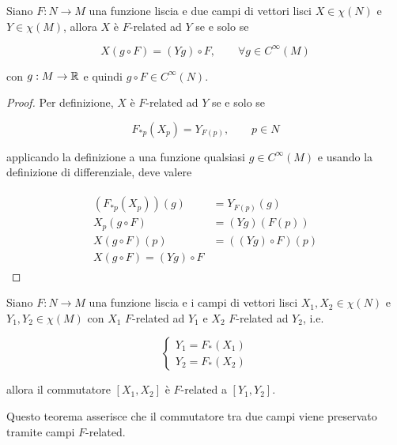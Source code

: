 \begin{theorem}
	Siano $ F : N \to M $ una funzione liscia e due campi di vettori lisci $ X \in \chi(N) $ e $ Y \in \chi(M) $, allora $ X $ è $ F $-related ad $ Y $ se e solo se
	
	\begin{equation}
		X(g \circ F) = (Y g) \circ F, \qquad \forall g \in C^{\infty}(M)
	\end{equation}

	con $ g : M \to \mathbb{R} $ e quindi $ g \circ F \in C^{\infty}(N) $.
\end{theorem}

\begin{proof}
	Per definizione, $ X $ è $ F $-related ad $ Y $ se e solo se
	
	\begin{equation}
		F_{*p}(X_{p}) = Y_{F(p)}, \qquad p \in N
	\end{equation}

	applicando la definizione a una funzione qualsiasi $ g \in C^{\infty}(M) $ e usando la definizione di differenziale, deve valere
	
	\begin{align}
		\begin{split}
			(F_{*p}(X_{p}))(g) &= Y_{F(p)}(g)\\
			X_{p}(g \circ F) &= (Y g)(F(p))\\
			X(g \circ F)(p) &= ((Y g) \circ F)(p)\\
			X(g \circ F) = (Y g) \circ F
		\end{split}
	\end{align}
\end{proof}

\begin{theorem}
	Siano $ F : N \to M $ una funzione liscia e i campi di vettori lisci $ X_{1},X_{2} \in \chi(N) $ e $ Y_{1},Y_{2} \in \chi(M) $ con $ X_{1} $ $ F $-related ad $ Y_{1} $ e $ X_{2} $ $ F $-related ad $ Y_{2} $, i.e.
	
	\begin{equation}
		\begin{cases}
			Y_{1} = F_{*}(X_{1})\\
			Y_{2} = F_{*}(X_{2})
		\end{cases}
	\end{equation}

	allora il commutatore $ [X_{1},X_{2}] $ è $ F $-related a $ [Y_{1},Y_{2}] $.
\end{theorem}

Questo teorema asserisce che il commutatore tra due campi viene preservato tramite campi $ F $-related.

